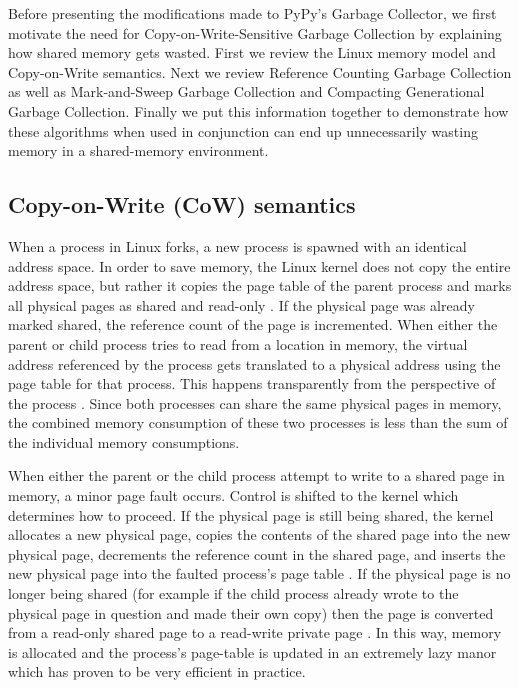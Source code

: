 \documentclass{article}
\begin{document}
Before presenting the modifications made to PyPy's Garbage Collector, we first motivate the need for Copy-on-Write-Sensitive Garbage Collection by explaining how shared memory gets wasted.  First we review the Linux memory model and Copy-on-Write semantics.  Next we review Reference Counting Garbage Collection as well as Mark-and-Sweep Garbage Collection and Compacting Generational Garbage Collection.  Finally we put this information together to demonstrate how these algorithms when used in conjunction can end up unnecessarily wasting memory in a shared-memory environment.  

\subsection{Copy-on-Write (CoW) semantics}\label{sec:CoW}

When a process in Linux forks, a new process is spawned with an identical address space.  In order to save memory, the Linux kernel does not copy the entire address space, but rather it copies the page table of the parent process and marks all physical pages as shared and read-only \cite{VMM}.  If the physical page was already marked shared, the reference count of the page is incremented.  When either the parent or child process tries to read from a location in memory, the virtual address referenced by the process gets translated to a physical address using the page table for that process.  This happens transparently from the perspective of the process \cite{VMM}.  Since both processes can share the same physical pages in memory, the combined memory consumption of these two processes is less than the sum of the individual memory consumptions.

When either the parent or the child process attempt to write to a shared page in memory, a minor page fault occurs.  Control is shifted to the kernel which determines how to proceed.  If the physical page is still being shared, the kernel allocates a new physical page, copies the contents of the shared page into the new physical page, decrements the reference count in the shared page, and inserts the new physical page into the faulted process's page table \cite{VMM}.  If the physical page is no longer being shared (for example if the child process already wrote to the physical page in question and made their own copy) then the page is converted from a read-only shared page to a read-write private page \cite{VMM}.  In this way, memory is allocated and the process's page-table is updated in an extremely lazy manor which has proven to be very efficient in practice.  
\end{document}
